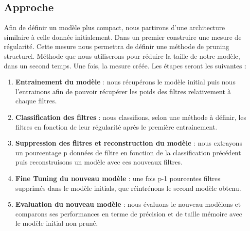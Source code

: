 \documentclass[12pt,a4paper]{article}
\begin{document}
\subsection{Approche}
Afin de définir un modèle plus compact, nous partirons d'une architecture similaire à celle donnée initialement. Dans un premier construire une mesure de régularité. Cette mesure nous permettra de définir une méthode de pruning structurel. Méthode que nous utiliserons pour 
réduire la taille de notre modèle, dans un second temps. 
 Une fois, la mesure créée. Les étapes seront les suivantes : 
\begin{enumerate}
    \item \textbf{Entrainement du modèle }: nous récupérons le modèle initial puis nous l'entrainons afin de pouvoir récupérer les poids des filtres relativement à chaque filtres. 
    \item \textbf{Classification des filtres }: nous classifions, selon une méthode à définir, les filtres en fonction de leur régularité après le première entrainement. 
    \item \textbf{Suppression des filtres et reconstruction du modèle} : nous extrayons un pourcentage p données de filtre en fonction de la classification précédent puis reconstruisons un modèle avec ces nouveaux filtres. 
    \item \textbf{Fine Tuning du nouveau modèle} : une fois p-1 pourcentes  filtres supprimés dans le modèle initials, que réintrénons le second modèle obtenu. 
    \item \textbf{Evaluation du nouveau modèle} : nous évaluons le nouveau modèlons et comparons ses performances en terme de précision et de taille mémoire avec le modèle initial non pruné. 
\end{enumerate}
\end{document}
